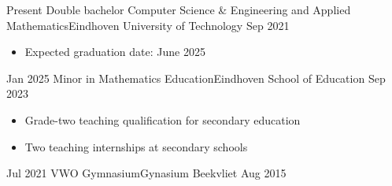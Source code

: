 %
%
%


\begin{educations}
    \education
        {Present}  {Double bachelor Computer Science \& Engineering and Applied Mathematics}{Eindhoven University of Technology}
        {Sep 2021} {
                    \begin{itemize}
                        \item Expected graduation date: June 2025
                    \end{itemize}
                   }
    \emptySeparator
    \education
        {Jan 2025} {Minor in Mathematics Education}{Eindhoven School of Education}
        {Sep 2023} {
                    \begin{itemize}
                        \item Grade-two teaching qualification for secondary education
                        \item Two teaching internships at secondary schools
                    \end{itemize}
                   }
    \emptySeparator
    \education
        {Jul 2021} {VWO Gymnasium}{Gynasium Beekvliet}
        {Aug 2015} {
                   }
\end{educations}

